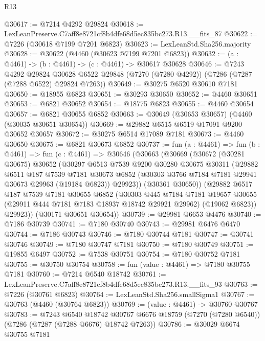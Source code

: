 \begin{lexlean}{R13}
\begin{coremodule}
@30617 := @7214 @4292 @29824
@30618 := LexLeanPreserve.C7aff8e8721cf8b4dfe68d5ec835bc273.R13.__fits_87
@30622 := @7226 (@30618 @7199 @7201 @6823)
@30623 := LexLeanStd.Sha256.majority
@30628 := @30622 (@4460 (@30623 @7199 @7201 @6823))
@30632 := (a : @4461) -> (b : @4461) -> (c : @4461) -> @30617 @30628
@30646 := @7243
    @4292
    @29824
    @30628
    @6522
    @29848
    (@7270 (@7280 @4292))
    (@7286 (@7287 (@7288 @6522) @29824 @7263))
@30649 := @30275 @6520 @30610 @7181
@30650 := @18955 @6823
@30651 := @30293 @30650
@30652 := @4460 @30651
@30653 := @6821 @30652
@30654 := @18775 @6823
@30655 := @4460 @30654
@30657 := @6821 @30655 @6852
@30663 := @30649 (@30653 @30657) (@4460 (@30035 @30651 @30654))
@30669 := @29882 @6515 @6519 @17091 @9200 @30652 @30657
@30672 := @30275 @6514 @17089 @7181
@30673 := @4460 @30650
@30675 := @6821 @30673 @6852
@30737 := fun (a : @4461) =>
  fun (b : @4461) =>
  fun (c : @4461) =>
  @30646
    (@30663
      (@30669
        (@30672
          (@30281 @30675)
          @30652
          (@30297
            @6513
            @7539
            @9200
            @30280
            @30675
            @30311
            (@29882
              @6511
              @187
              @7539
              @7181
              @30673
              @6852
              (@30303 @3766 @7184 @7181 @29941 @30673 @29963 (@19184 @6823))
              @29923))
          (@30361 @30650))
        (@29882
          @6517
          @187
          @7539
          @7181
          @30655
          @6852
          (@30303
            @445
            @7184
            @7181
            @19657
            @30655
            (@29911 @444 @7181 @7183 @18937 @18742 @29921 @29962)
            (@19062 @6823))
          @29923))
      (@30171 @30651 @30654))
@30739 := @29981 @6653 @4476
@30740 := @7186 @30739
@30741 := @7180 @30740
@30743 := @29981 @6476 @6470
@30744 := @7186 @30743
@30746 := @7180 @30744 @7181
@30747 := @30741 @30746
@30749 := @7180 @30747 @7181
@30750 := @7180 @30749
@30751 := @19855 @6497
@30752 := @7538 @30751
@30754 := @7180 @30752 @7181
@30755 := @30750 @30754
@30758 := fun (value : @4461) => @7180 @30755 @7181
@30760 := @7214 @6540 @18742
@30761 := LexLeanPreserve.C7aff8e8721cf8b4dfe68d5ec835bc273.R13.__fits_93
@30763 := @7226 (@30761 @6823)
@30764 := LexLeanStd.Sha256.smallSigma1
@30767 := @30763 (@4460 (@30764 @6823))
@30769 := (value : @4461) -> @30760 @30767
@30783 := @7243
    @6540
    @18742
    @30767
    @6676
    @18759
    (@7270 (@7280 @6540))
    (@7286 (@7287 (@7288 @6676) @18742 @7263))
@30786 := @30029 @6674 @30755 @7181

\end{coremodule}
\end{lexlean}

